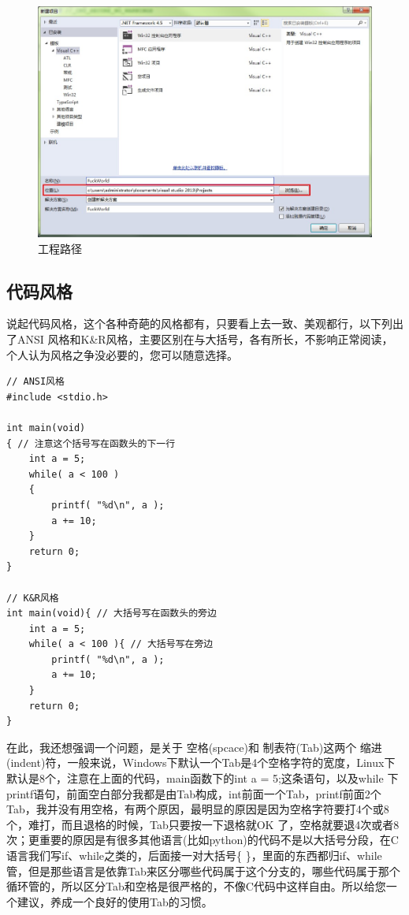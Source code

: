 \documentclass[11pt,twoside,a4paper,titlepage]{article}	%
\newcommand{\kw}[1]{\textcolor[rgb]{0.0,0.0,0.63}{ #1}}
\begin{document}
\begin{figure}[bpht]
\centering
\includegraphics[scale=.5]{../src/projectpath.jpg}
\caption{工程路径}
\label{fig:projectPath}
\end{figure}

\subsection{代码风格}
说起代码风格，这个各种奇葩的风格都有，只要看上去一致、美观都行，以下列出了ANSI 风格和K\&R风格，主要区别在与大括号，各有所长，不影响正常阅读，个人认为风格之争没必要的，您可以随意选择。

\begin{lstlisting}
// ANSI风格
#include <stdio.h>

int main(void)
{ // 注意这个括号写在函数头的下一行
	int a = 5;
	while( a < 100 )
	{
		printf( "%d\n", a );
		a += 10;
	}
	return 0;
}

// K&R风格
int main(void){ // 大括号写在函数头的旁边
	int a = 5;
	while( a < 100 ){ // 大括号写在旁边
		printf( "%d\n", a );
		a += 10;
	}
	return 0;
}
\end{lstlisting}

在此，我还想强调一个问题，是关于\kw{空格(spcace)}和\kw{制表符(Tab)}这两个\kw{缩进(indent)}符，一般来说，Windows下默认一个Tab是4个空格字符的宽度，Linux下默认是8个，注意在上面的代码，main函数下的int a = 5;这条语句，以及while 下printf语句，前面空白部分我都是由Tab构成，int前面一个Tab，printf前面2个Tab，我并没有用空格，有两个原因，最明显的原因是因为空格字符要打4个或8 个，难打，而且退格的时候，Tab只要按一下退格就OK 了，空格就要退4次或者8次；更重要的原因是有很多其他语言(比如python)的代码不是以大括号分段，在C语言我们写if、while之类的，后面接一对大括号\{ \}，里面的东西都归if、while管，但是那些语言是依靠Tab来区分哪些代码属于这个分支的，哪些代码属于那个循环管的，所以区分Tab和空格是很严格的，不像C代码中这样自由。所以给您一个建议，养成一个良好的使用Tab的习惯。
\end{document}
